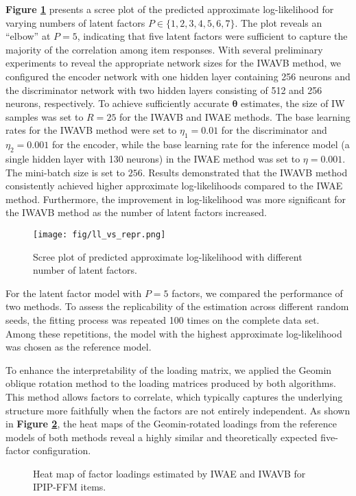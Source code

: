\documentclass[a4paper,12pt]{article}
\theoremstyle{plain} %
\theoremstyle{remark} %
\theoremstyle{definition} %
\begin{document}
\textbf{Figure \ref{fig:ll_vs_repr}} presents a scree plot of the predicted approximate log-likelihood for varying numbers of latent factors $P \in \{1, 2, 3, 4, 5, 6, 7\}$. The plot reveals an ``elbow'' at $P=5$, indicating that five latent factors were sufficient to capture the majority of the correlation among item responses. With several preliminary experiments to reveal the appropriate network sizes for the IWAVB method, we configured the encoder network with one hidden layer containing 256 neurons and the discriminator network with two hidden layers consisting of 512 and 256 neurons, respectively. To achieve sufficiently accurate $\bm{\theta}$ estimates, the size of IW samples was set to $R=25$ for the IWAVB and IWAE methods. The base learning rates for the IWAVB method were set to $\eta_1=0.01$ for the discriminator and $\eta_2=0.001$ for the encoder, while the base learning rate for the inference model (a single hidden layer with 130 neurons) in the IWAE method was set to $\eta=0.001$. The mini-batch size is set to $256$. Results demonstrated that the IWAVB method consistently achieved higher approximate log-likelihoods compared to the IWAE method. Furthermore, the improvement in log-likelihood was more significant for the IWAVB method as the number of latent factors increased.
\begin{figure}[htb]
\centering
\texttt{[image: fig/ll\_vs\_repr.png]}
\caption{Scree plot of predicted approximate log-likelihood with different number of latent factors.}
\label{fig:ll_vs_repr}
\end{figure}

For the latent factor model with $P=5$ factors, we compared the performance of two methods. To assess the replicability of the estimation across different random seeds, the fitting process was repeated 100 times on the complete data set. Among these repetitions, the model with the highest approximate log-likelihood was chosen as the reference model.

To enhance the interpretability of the loading matrix, we applied the Geomin oblique rotation method \citep{yates1987multivariate} to the loading matrices produced by both algorithms. This method allows factors to correlate, which typically captures the underlying structure more faithfully when the factors are not entirely independent. As shown in \textbf{Figure \ref{fig:load_avb_vae}}, the heat maps of the Geomin-rotated loadings from the reference models of both methods reveal a highly similar and theoretically expected five-factor configuration.
\begin{figure}[htb]
    \centering

    \caption{Heat map of factor loadings estimated by IWAE and IWAVB for IPIP-FFM items.}
    \label{fig:load_avb_vae}
\end{figure}
\end{document}
